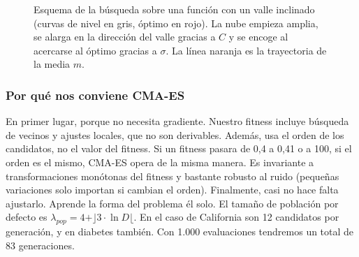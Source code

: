 \begin{figure}[htbp]
\centering
{}
\caption{Esquema de la búsqueda sobre una función con un valle inclinado (curvas
de nivel en gris, óptimo en rojo). La nube empieza amplia, se alarga en la
dirección del valle gracias a $C$ y se encoge al acercarse al óptimo gracias a
$\sigma$. La línea naranja es la trayectoria de la media $m$.}
\label{fig:cmaelipses}
\end{figure}

\subsubsection{Por qué nos conviene CMA-ES}

En primer lugar, porque no necesita gradiente. Nuestro fitness incluye  búsqueda de vecinos y ajustes locales, que no son derivables. Además, usa el orden de los candidatos, no el valor del fitness. Si un fitness pasara de 0,4 a 0,41 o a 100, si el orden es el mismo, CMA-ES opera de la misma manera. Es invariante a transformaciones monótonas del fitness y bastante robusto al ruido (pequeñas variaciones solo importan si cambian el orden). Finalmente, casi no hace falta ajustarlo. Aprende la forma del problema él solo. El tamaño de población por defecto es $\lambda_{pop}=4+\rfloor 3 \cdot \ln D\lfloor$. En el caso de California son 12 candidatos por generación, y en diabetes también. Con 1.000 evaluaciones tendremos un total de 83 generaciones. 

